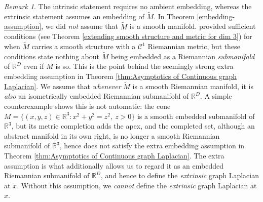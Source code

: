 \documentclass{amsart}
\let\oldcitet\citet
\renewcommand{\citet}[1]{\textcolor{blue}{\oldcitet{#1}}}
\theoremstyle{definition}
\theoremstyle{remark}
\newtheorem{remark}[theorem]{Remark}
\newcommand{\nd}{\noindent}
\newcommand{\Ddim}{\mathbb{R}^D}
\newcommand{\0}{\boldsymbol{0}}
\def\cC{\mathcal C}
\begin{document}
\begin{remark}\label{rmk:explantion-embedding}
    The intrinsic statement requires no ambient embedding, whereas the extrinsic statement assumes an embedding of $\widetilde{M}.$
    In Theorem \ref{embedding-assumption}, we did \textit{not} assume that $\widetilde{M}$ is a smooth manifold. \citet{SmithYang1992} provided sufficient conditions (see Theorem \ref{extending smooth structure and metric for dim 3}) for when $\widetilde{M}$ carries a smooth structure with a $\cC^1$ Riemannian metric, but these conditions state nothing about $\widetilde{M}$ being embedded as a Riemannian \textit{submanifold} of $\Ddim$ even if $M$ is so. This is the point behind the seemingly strong extra embedding assumption in Theorem \ref{thm:Asymptotics of Continuous graph Laplacian}. We assume that \textit{whenever} $\widetilde{M}$ is a smooth Riemannian manifold, it is \textit{also} an isometrically embedded Riemannian submanifold of $\Ddim.$ A simple counterexample shows this is not automatic: the cone $M=\{(x,y,z)\in\mathbb{R}^3:x^2+y^2=z^2,\ z>0\}$ is a smooth embedded submanifold of $\mathbb{R}^3$, but its metric completion adds the apex, and the completed set, although an abstract manifold in its own right, is no longer a smooth Riemannian submanifold of $\mathbb{R}^3$, hence does not satisfy the  extra embedding assumption in Theorem \ref{thm:Asymptotics of Continuous graph Laplacian}. The extra assumption is what additionally allows us to regard it as an embedded Riemannian submanifold of $\Ddim$, and hence to define the \textit{extrinsic} graph Laplacian at $x.$ Without this assumption, we \textit{cannot} define the \textit{extrinsic} graph Laplacian at $x.$
\end{remark}

\end{document}
